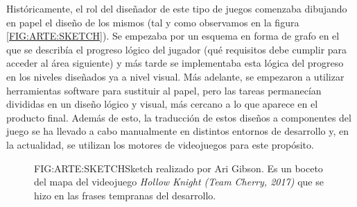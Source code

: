 Históricamente, el rol del diseñador de este tipo de juegos comenzaba dibujando en papel el diseño de los mismos (tal y como observamos en la figura \ref{FIG:ARTE:SKETCH}). Se empezaba por un esquema en forma de grafo en el que se describía el progreso lógico del jugador (qué requisitos debe cumplir para acceder al área siguiente) y más tarde se implementaba esta lógica del progreso en los niveles diseñados ya a nivel visual.
Más adelante, se empezaron a utilizar herramientas software para sustituir al papel, pero las tareas permanecían divididas en un diseño lógico y visual, más cercano a lo que aparece en el producto final.
Además de esto, la traducción de estos diseños a componentes del juego se ha llevado a cabo manualmente en distintos entornos de desarrollo y, en la actualidad, se utilizan los motores de videojuegos para este propósito.

\begin{figure}{FIG:ARTE:SKETCH}{Sketch realizado por Ari Gibson. Es un boceto del mapa del videojuego  \textit{Hollow Knight (Team Cherry, 2017)} que se hizo en las frases tempranas del desarrollo.}
\end{figure}